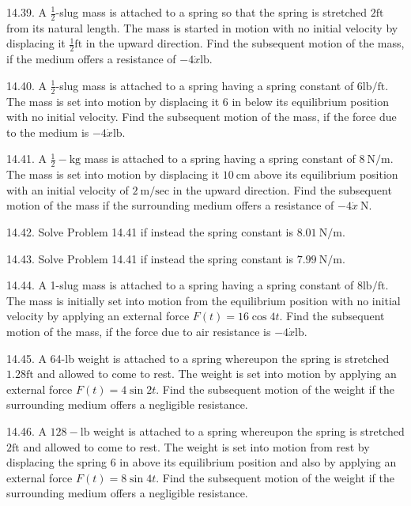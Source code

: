 \documentclass[10pt]{article}
\begin{document}
14.39. A $\frac{1}{2}$-slug mass is attached to a spring so that the spring is stretched $2 \mathrm{ft}$ from its natural length. The mass is started in motion with no initial velocity by displacing it $\frac{1}{2} \mathrm{ft}$ in the upward direction. Find the subsequent motion of the mass, if the medium offers a resistance of $-4 \dot{x} \mathrm{lb}$.

14.40. A $\frac{1}{2}$-slug mass is attached to a spring having a spring constant of $6 \mathrm{lb} / \mathrm{ft}$. The mass is set into motion by displacing it 6 in below its equilibrium position with no initial velocity. Find the subsequent motion of the mass, if the force due to the medium is $-4 \dot{x} \mathrm{lb}$.

14.41. A $\frac{1}{2}-\mathrm{kg}$ mass is attached to a spring having a spring constant of $8 \mathrm{~N} / \mathrm{m}$. The mass is set into motion by displacing it $10 \mathrm{~cm}$ above its equilibrium position with an initial velocity of $2 \mathrm{~m} / \mathrm{sec}$ in the upward direction. Find the subsequent motion of the mass if the surrounding medium offers a resistance of $-4 \dot{x} \mathrm{~N}$.

14.42. Solve Problem 14.41 if instead the spring constant is $8.01 \mathrm{~N} / \mathrm{m}$.

14.43. Solve Problem 14.41 if instead the spring constant is $7.99 \mathrm{~N} / \mathrm{m}$.

14.44. A 1-slug mass is attached to a spring having a spring constant of $8 \mathrm{lb} / \mathrm{ft}$. The mass is initially set into motion from the equilibrium position with no initial velocity by applying an external force $F(t)=16 \cos 4 t$. Find the subsequent motion of the mass, if the force due to air resistance is $-4 \dot{x} \mathrm{lb}$.

14.45. A 64-lb weight is attached to a spring whereupon the spring is stretched $1.28 \mathrm{ft}$ and allowed to come to rest. The weight is set into motion by applying an external force $F(t)=4 \sin 2 t$. Find the subsequent motion of the weight if the surrounding medium offers a negligible resistance.

14.46. A $128-\mathrm{lb}$ weight is attached to a spring whereupon the spring is stretched $2 \mathrm{ft}$ and allowed to come to rest. The weight is set into motion from rest by displacing the spring 6 in above its equilibrium position and also by applying an external force $F(t)=8 \sin 4 t$. Find the subsequent motion of the weight if the surrounding medium offers a negligible resistance.
\end{document}
